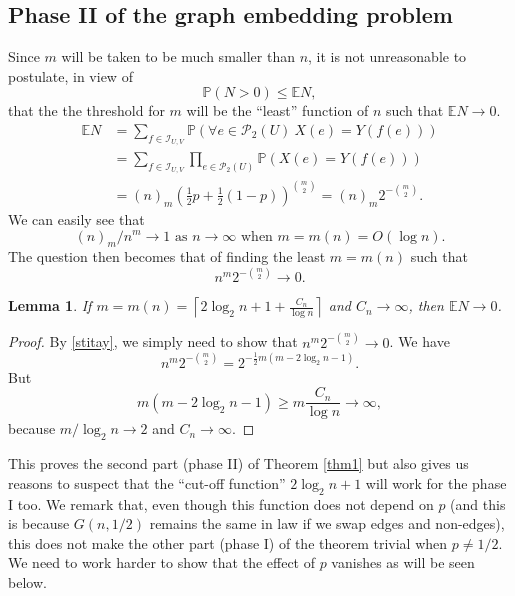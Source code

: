\documentclass[reqno]{amsart}
\theoremstyle{theorem}
\newtheorem{lemma}[theorem]{Lemma}
\theoremstyle{definition}
\theoremstyle{remark}
\def\P{\mathbb{P}}
\def\E{\mathbb{E}}
\def\PP{\mathscr{P}}
\newcommand{\1}{{\text{\Large $\mathfrak 1$}}}	%
\numberwithin{equation}{section}
\def\II{\mathscr I}
\begin{document}
\subsection{\bfseries Phase II of the graph embedding problem}
\label{PH2emb}
Since $m$ will be taken to be much smaller than $n$, it is not unreasonable
to postulate, in view of 
\[
\P(N > 0) \leq \E N,
\]
that the the threshold for $m$ will be the ``least'' function of $n$ such that
$\E N \to 0$.
\begin{align}
\E N &= \sum_{f \in \II_{U,V}} \P(\forall e \in \PP_2(U)~ X(e)=Y(f(e)))
\nonumber
\\
&= \sum_{f \in \II_{U,V}} \prod_{e \in \PP_2(U)} \P(X(e)=Y(f(e)))
\nonumber
\\
&= (n)_m \left(\tfrac12 p + \tfrac12 (1-p) \right)^{\binom{m}{2}}
= (n)_m 2^{-\binom{m}{2}}.
\label{ENone}
\end{align}
We can easily see that
\begin{equation}
\label{stitay}
\text{$(n)_m/n^m \to 1$ as $n \to \infty$ when $m=m(n)=O(\log n)$}.
\end{equation}
The question then becomes that of finding the least $m=m(n)$ such
that 
\[
n^m 2^{-\binom{m}{2}} \to 0.
\]
\begin{lemma}
If $m=m(n) = \left\lceil 2 \log_2 n + 1 + \frac{C_n}{\log n}\right\rceil$
and $C_n \to \infty$, then $\E N \to 0$.
\end{lemma}
\begin{proof}
By \eqref{stitay}, we simply need to show that $n^m 2^{-\binom{m}{2}}\to 0$.
We have 
\[
n^m 2^{-\binom{m}{2}} 
= 2^{- \frac12 m(m-2 \log_2 n -1)}.
\]
But
\[
m(m- 2 \log_2 n -1) \ge m \frac{C_n}{\log n} \to \infty,
\]
because $m/\log_2 n \to 2$ and $C_n \to \infty$.
\end{proof}



This proves the second part (phase II) of Theorem \ref{thm1} but also gives us
reasons to suspect that the ``cut-off function'' 
$2\log_2 n+1$ will work for the phase I too.
We remark that, even though this function does not depend on $p$ (and this
is because $G(n,1/2)$ remains the same in law if we swap edges and non-edges),
this does not make the other part (phase I) of the theorem trivial 
when $p\neq 1/2$. We need to work harder to show that the effect of $p$ vanishes
as will be seen below.
\end{document}

